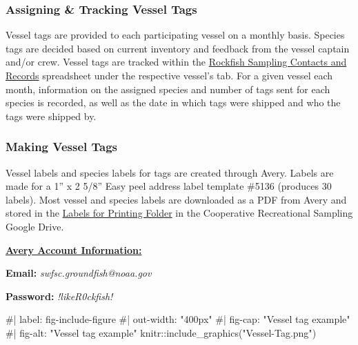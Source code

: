 \documentclass[
  letterpaper,
  DIV=11,
  numbers=noendperiod]{scrartcl}
\newenvironment{Shaded}{\begin{snugshade}}{\end{snugshade}}
\newcommand{\CommentTok}[1]{\textcolor[rgb]{0.37,0.37,0.37}{#1}}
\newcommand{\FunctionTok}[1]{\textcolor[rgb]{0.28,0.35,0.67}{#1}}
\newcommand{\NormalTok}[1]{\textcolor[rgb]{0.00,0.23,0.31}{#1}}
\newcommand{\SpecialCharTok}[1]{\textcolor[rgb]{0.37,0.37,0.37}{#1}}
\newcommand{\StringTok}[1]{\textcolor[rgb]{0.13,0.47,0.30}{#1}}
\begin{document}
\hypertarget{assigning-tracking-vessel-tags}{%
\subsubsection{Assigning \& Tracking Vessel
Tags}\label{assigning-tracking-vessel-tags}}

Vessel tags are provided to each participating vessel on a monthly
basis. Species tags are decided based on current inventory and feedback
from the vessel captain and/or crew. Vessel tags are tracked within the
\href{https://docs.google.com/spreadsheets/d/1hVaB7Wh5BB_hfSLxPLvWwM52cUw4IfROGIHiH_5Y8YM/edit?usp=sharing}{Rockfish
Sampling Contacts and Records} spreadsheet under the respective vessel's
tab. For a given vessel each month, information on the assigned species
and number of tags sent for each species is recorded, as well as the
date in which tags were shipped and who the tags were shipped by.

\hypertarget{making-vessel-tags}{%
\subsubsection{Making Vessel Tags}\label{making-vessel-tags}}

Vessel labels and species labels for tags are created through Avery.
Labels are made for a 1'' x 2 5/8'' Easy peel address label template
\#5136 (produces 30 labels). Most vessel and species labels are
downloaded as a PDF from Avery and stored in the
\href{https://drive.google.com/drive/folders/1RhFYLp9Z7GObnFLIC52e8ql9CKm6dATv?usp=drive_link}{Labels
for Printing Folder} in the Cooperative Recreational Sampling Google
Drive.

\ul{\textbf{Avery Account Information:}}

\textbf{Email:} \emph{swfsc.groundfish@noaa.gov}

\textbf{Password:} \emph{!likeR0ckfish!}

\begin{Shaded}
\begin{Highlighting}[]
\CommentTok{\#| label: fig{-}include{-}figure}
\CommentTok{\#| out{-}width: "400px"}
\CommentTok{\#| fig{-}cap: "Vessel tag example"}
\CommentTok{\#| fig{-}alt: "Vessel tag example"}
\NormalTok{knitr}\SpecialCharTok{::}\FunctionTok{include\_graphics}\NormalTok{(}\StringTok{"Vessel{-}Tag.png"}\NormalTok{)}
\end{Highlighting}
\end{Shaded}
\end{document}
